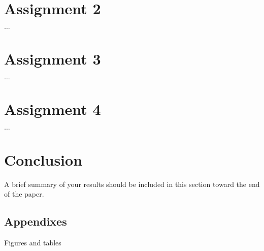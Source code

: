 \documentclass[
	10pt,								%
	letterpaper,         		%
	twocolumn,
	]{article}
\begin{document}
\section*{Assignment 2}\label{sec:Ass1}
$\dots$
%
%
\section*{Assignment 3}\label{sec:Ass1}
$\dots$
%
%
\section*{Assignment 4}\label{sec:Ass1}
$\dots$
%
%
\section*{Conclusion}
A brief summary of your results should be included in this section toward the end of the paper.
%
%
\begin{appendices}
\section*{Appendixes}
Figures and tables 

\end{appendices}


\end{document}
